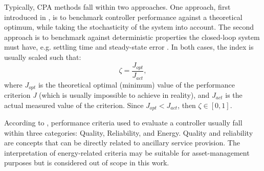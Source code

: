 		Typically, CPA methods fall within two approaches. One approach, first introduced in \cite{Harris1989}, is to benchmark controller performance against a theoretical optimum, while taking the stochasticity of the system into account. The second approach is to benchmark against deterministic properties the closed-loop system must have, e.g. settling time and steady-state error \cite{Astrom}. In both cases, the index is usually scaled such that:
\begin{equation}
	\zeta = \frac{J_{opt}}{J_{act}},\label{eq:astrom}
\end{equation}
where $J_{opt}$ is the theoretical optimal (minimum) value of the performance criterion \emph{J} (which is usually impossible to achieve in reality), and $J_{act}$ is the actual measured value of the criterion. Since $J_{opt}<J_{act}$, then $\zeta \in [0,1]$. 

		According to \cite{Green}, performance criteria used to evaluate a controller usually fall within three categories: Quality, Reliability, and Energy. Quality and reliability are concepts that can be directly related to ancillary service provision. The interpretation of energy-related criteria may be suitable for asset-management purposes but is considered out of scope in this work.%
